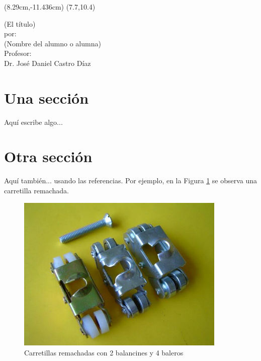 \documentclass[12pt]{article}
\begin{document}
	
	
	\decimalpoint
	
	\renewcommand{\tablename}{Tabla}
	
	\fancyput(8.29cm,-11.436cm){
		\setlength{\unitlength}{1in}\hspace{-0.2cm}\fancyoval(7.7,10.4)}
	\thispagestyle{empty}
	\vspace*{\fill}
	\begin{center}
		{\huge (El título)\\\vspace{0.7cm}
	}\vspace{2cm} 
		{\Large por:}	\\\vspace{1cm} 
		{\Large (Nombre del alumno o alumna)\\}
		\vspace{6cm} 
	Profesor:\\
	Dr. José Daniel Castro Díaz
		
		
		
	\end{center}
	
	
	
	
	\vspace*{\fill}	
	
	\newpage
	\setcounter{page}{1}
	
	
	\newpage
	
	\section{Una sección}
Aquí escribe algo...
    \section{Otra sección}
Aquí también... usando las referencias. Por ejemplo, en la Figura \ref{Baleros} se observa una carretilla remachada. 
    
    	\begin{figure}[h]
		\centering
		\includegraphics[width=10cm]{Ensamble}
		\caption{Carretillas remachadas con 2 balancines y 4 baleros}
		\label{Baleros}
	\end{figure}


    

	
\end{document}
